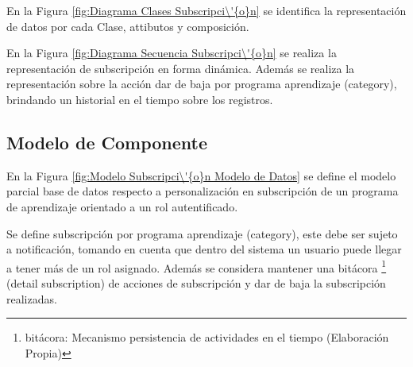 En la Figura \ref{fig:Diagrama Clases Subscripci\'{o}n} se identifica la
representaci\'{o}n de datos por cada Clase, attibutos y composici\'{o}n.

\begin{minipage}{1.0\textwidth}
	\centering
	\label{fig:Diagrama Clases Subscripci\'{o}n}
\end{minipage}

En la Figura \ref{fig:Diagrama Secuencia Subscripci\'{o}n} se realiza la
representaci\'{o}n de subscripci\'{o}n en forma din\'{a}mica. Adem\'{a}s se 
realiza la representaci\'{o}n sobre la acci\'{o}n dar de baja por programa
aprendizaje (category), brindando un historial en el tiempo sobre los registros. 

\begin{minipage}{1.0\textwidth}
\centering
{}
\label{fig:Diagrama Secuencia Subscripci\'{o}n}
\end{minipage}

\subsection{Modelo de Componente}

En la Figura \ref{fig:Modelo Subscripci\'{o}n Modelo de Datos} se define el 
modelo parcial base de datos respecto a personalizaci\'{o}n en subscripci\'{o}n
de un programa de aprendizaje orientado a un rol autentificado. 

\begin{minipage}{1.0\textwidth}
	\centering
	\label{fig:Modelo Subscripci\'{o}n Modelo de Datos}
\end{minipage}

Se define subscripci\'{o}n por programa aprendizaje (category), este debe ser
sujeto a notificaci\'{o}n, tomando en cuenta que dentro del sistema un usuario
puede llegar a tener m\'{a}s de un rol asignado. Adem\'{a}s se considera 
mantener una bit\'{a}cora \footnote{bit\'{a}cora: Mecanismo persistencia de 
actividades en el tiempo (Elaboraci\'{o}n Propia)} (detail\textunderscore 
subscription) de acciones de subscripci\'{o}n y dar de baja la 
subscripci\'{o}n realizadas.


